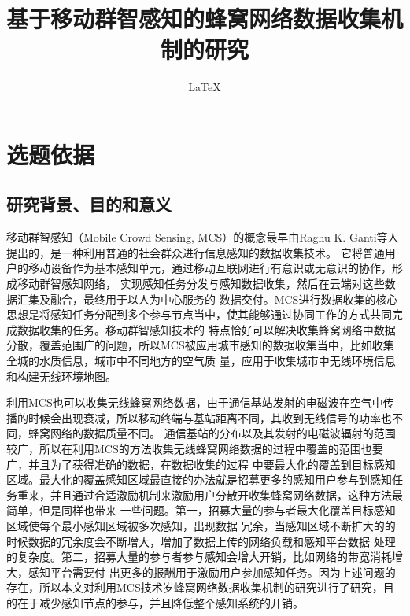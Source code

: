 \documentclass[UTF8]{ctexart}
\title{基于移动群智感知的蜂窝网络数据收集机制的研究}
\author{\LaTeX}
\begin{document}
\maketitle

\section{选题依据}
\subsection{研究背景、目的和意义}


移动群智感知（Mobile Crowd Sensing, MCS）的概念最早由Raghu K. Ganti等人提出的，是一种利用普通的社会群众进行信息感知的数据收集技术。
它将普通用户的移动设备作为基本感知单元，通过移动互联网进行有意识或无意识的协作，形成移动群智感知网络，
实现感知任务分发与感知数据收集，然后在云端对这些数据汇集及融合，最终用于以人为中心服务的
数据交付。MCS进行数据收集的核心思想是将感知任务分配到多个参与节点当中，使其能够通过协同工作的方式共同完成数据收集的任务。移动群智感知技术的
特点恰好可以解决收集蜂窝网络中数据分散，覆盖范围广的问题，所以MCS被应用城市感知的数据收集当中，比如收集全城的水质信息，城市中不同地方的空气质
量，应用于收集城市中无线环境信息和构建无线环境地图。%

利用MCS也可以收集无线蜂窝网络数据，由于通信基站发射的电磁波在空气中传播的时候会出现衰减，所以移动终端与基站距离不同，其收到无线信号的功率也不同，蜂窝网络的数据质量不同。
通信基站的分布以及其发射的电磁波辐射的范围较广，所以在利用MCS的方法收集无线蜂窝网络数据的过程中覆盖的范围也要广，并且为了获得准确的数据，在数据收集的过程
中要最大化的覆盖到目标感知区域。最大化的覆盖感知区域最直接的办法就是招募更多的感知用户参与到感知任务重来，并且通过合适激励机制来激励用户分散开收集蜂窝网络数据，这种方法最简单，但是同样也带来
一些问题。第一，招募大量的参与者最大化覆盖目标感知区域使每个最小感知区域被多次感知，出现数据
冗余，当感知区域不断扩大的的时候数据的冗余度会不断增大，增加了数据上传的网络负载和感知平台数据
处理的复杂度。第二，招募大量的参与者参与感知会增大开销，比如网络的带宽消耗增大，感知平台需要付
出更多的报酬用于激励用户参加感知任务。因为上述问题的存在，所以本文对利用MCS技术岁蜂窝网络数据收集机制的研究进行了研究，目的在于减少感知节点的参与，并且降低整个感知系统的开销。
\end{document}
